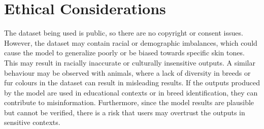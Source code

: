 \documentclass{article} %
\begin{document}
\section{Ethical Considerations}
\label{ethical}

The dataset being used is public, so there are no copyright or consent issues. However, the dataset may contain racial or demographic imbalances, which could cause the model 
to generalize poorly or be biased towards specific skin tones. This may result in racially inaccurate or culturally insensitive outputs. A similar behaviour may be observed with 
animals, where a lack of diversity in breeds or fur colours in the dataset can result in misleading results. If the outputs produced by the model are used in educational contexts 
or in breed identification, they can contribute to misinformation. Furthermore, since the model results are plausible but cannot be verified, there is a risk that users may 
overtrust the outputs in sensitive contexts.

\label{last_page}

\newpage


\end{document}
